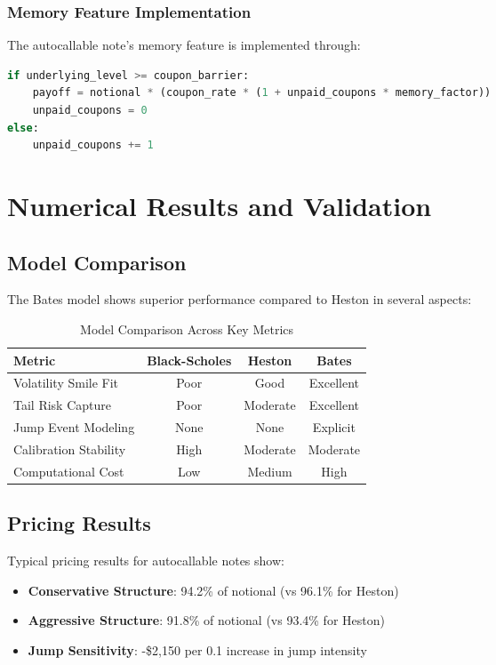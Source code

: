 \documentclass[12pt,a4paper]{article}
\begin{document}
\subsubsection{Memory Feature Implementation}
The autocallable note's memory feature is implemented through:
\begin{lstlisting}[language=Python]
if underlying_level >= coupon_barrier:
    payoff = notional * (coupon_rate * (1 + unpaid_coupons * memory_factor))
    unpaid_coupons = 0
else:
    unpaid_coupons += 1
\end{lstlisting}

\section{Numerical Results and Validation}

\subsection{Model Comparison}

The Bates model shows superior performance compared to Heston in several aspects:

\begin{table}[H]
\centering
\begin{tabular}{|l|c|c|c|}
\hline
\textbf{Metric} & \textbf{Black-Scholes} & \textbf{Heston} & \textbf{Bates} \\
\hline
Volatility Smile Fit & Poor & Good & Excellent \\
Tail Risk Capture & Poor & Moderate & Excellent \\
Jump Event Modeling & None & None & Explicit \\
Calibration Stability & High & Moderate & Moderate \\
Computational Cost & Low & Medium & High \\
\hline
\end{tabular}
\caption{Model Comparison Across Key Metrics}
\end{table}

\subsection{Pricing Results}

Typical pricing results for autocallable notes show:

\begin{itemize}
    \item \textbf{Conservative Structure}: 94.2\% of notional (vs 96.1\% for Heston)
    \item \textbf{Aggressive Structure}: 91.8\% of notional (vs 93.4\% for Heston)
    \item \textbf{Jump Sensitivity}: -\$2,150 per 0.1 increase in jump intensity
\end{itemize}
\end{document}

